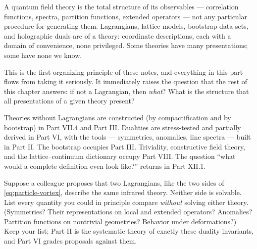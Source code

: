 \begin{iidea}
\label{idea:observables}
A quantum field theory is the total structure of its observables --- correlation
functions, spectra, partition functions, extended operators --- not any
particular procedure for generating them. Lagrangians, lattice models, bootstrap
data sets, and holographic duals are  of a theory:
coordinate descriptions, each with a domain of convenience, none privileged.
Some theories have many presentations; some have none we know.
\end{iidea}

This is the first organizing principle of these notes, and everything in this
part flows from taking it seriously. It immediately raises the question that the
rest of this chapter answers: if not a Lagrangian, then \emph{what}? What is the
structure that all presentations of a given theory present?

\begin{ppreview}
Theories without Lagrangians are constructed (by compactification and by
bootstrap) in Part VII.4 and Part III. Dualities are stress-tested and partially
derived in Part VI, with the tools --- symmetries, anomalies, line spectra ---
built in Part II. The bootstrap occupies Part III. Triviality, constructive
field theory, and the lattice--continuum dictionary occupy Part VIII. The
question ``what would a complete definition even look like?'' returns in Part
XII.1.
\end{ppreview}

\begin{exercise}[thinker]
\label{exr:duality-test}
Suppose a colleague proposes that two Lagrangians, like the two sides of
\eqref{eq:particle-vortex}, describe the same infrared theory. Neither side is
solvable. List every quantity you could in principle compare \emph{without}
solving either theory. (Symmetries? Their representations on local and extended
operators? Anomalies? Partition functions on nontrivial geometries? Behavior
under deformations?) Keep your list; Part II is the systematic theory of exactly
these duality invariants, and Part VI grades proposals against them.
\end{exercise}


